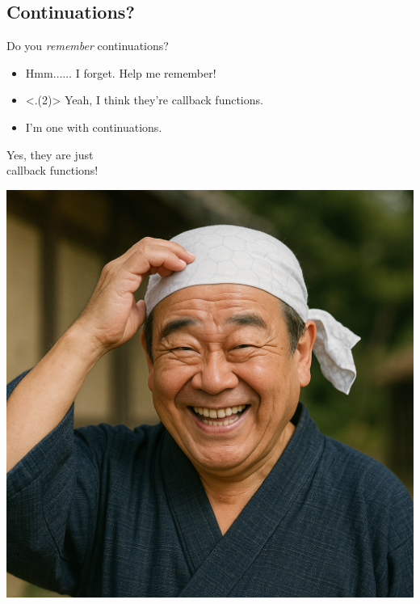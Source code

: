 \subsection{Continuations?}
\begin{frame}
	\frametitlesubs

	Do you \textit{remember} continuations?

	\pause
	\begin{itemize}[<+->]
		\item[\emoji{man-raising-hand}] Hmm$\dots\dots$ I forget. Help me remember!
		\item[\emoji{man-raising-hand}] {\semibf} Yeah, I think they're callback functions.
		\item[\emoji{old-man}] I'm one with continuations.
	\end{itemize}

	\onslide<+->
	\center
	\Large

	\begin{minipage}[c]{.55\linewidth}
		\center
		Yes, they are just\\ \LARGE\textcolor{subhighlight}{callback functions!}
	\end{minipage}
	\begin{minipage}[c]{.38\linewidth}
		\includegraphics[height=.5\textheight]{img/ukkari.png}
	\end{minipage}
\end{frame}

